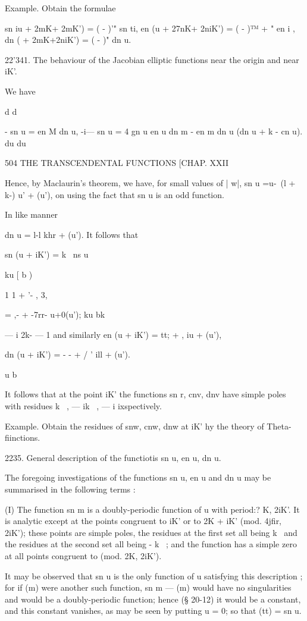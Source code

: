 Example. Obtain the formulae

sn iu + 2mK+ 2mK') = ( - )'" sn ti, en (u + 27nK+ 2niK') = ( - )™ + "
en i , dn ( + 2mK+2niK') = ( - )" dn u.

22'341. The behaviour of the Jacobian elliptic functions near the
origin and near iK'.

We have

d d

- sn u = en M dn u, -i— sn u = 4 gn u en u dn m - en m dn u (dn u + k
- cn u). du du



504 THE TRANSCENDENTAL FUNCTIONS [CHAP. XXII

Hence, by Maclaurin's theorem, we have, for small values of | w|, sn u
=u-~(l + k-) u' + (u'), on using the fact that sn u is an odd
function.



In like manner



dn u = l-l khr + (u'). It follows that

sn (u + iK') = k~ ns u

ku [ b )

1 1 + '- , 3,

= ,- + -7rr- u+0(u'); ku bk

— i 2k- — 1 and similarly en (u + iK') = tt; + , iu + (u'),

dn (u + iK') = - - + / ' ill + (u').

u b

It follows that at the point iK' the functions sn r, cnv, dnv have
simple poles with residues k~ , — ik~ , — i ixspectively.

Example. Obtain the residues of snw, cnw, dnw at iK' hy the theory of
Theta- fiinctions.

2235. General description of the functiotis sn u, en u, dn u.

The foregoing investigations of the functions sn u, en u and dn u may
be summarised in the following terms :

(I) The function sn m is a doubly-periodic function of u with period:?
K, 2iK'. It is analytic except at the points congruent to iK' or to 2K
+ iK' (mod. 4jfir, 2iK'); these points are simple poles, the residues
at the first set all being k~ and the residues at the second set all
being - k~ ; and the function has a simple zero at all points
congruent to (mod. 2K, 2iK').

It may be observed that sn u is the only function of u satisfying this
description ; for if (m) were another such function, sn m — (m) would
have no singularities and would be a doubly-periodic function; hence
(§ 20-12) it would be a constant, and this constant vanishes, as may
be seen by putting u = 0; so that (tt) = sn u.

